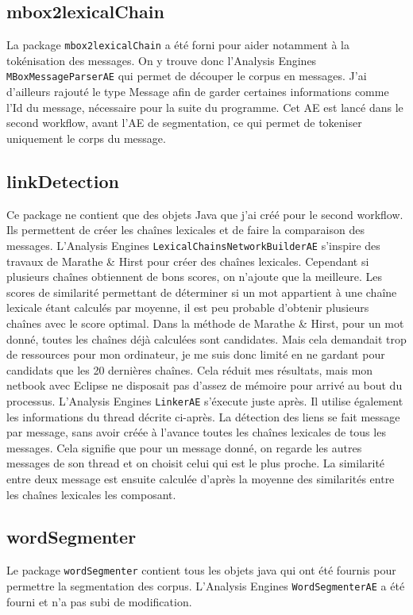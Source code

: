 \documentclass[a4paper]{article}
\begin{document}
	\subsection{mbox2lexicalChain}
	La package \texttt{mbox2lexicalChain} a été forni pour aider notamment à la tokénisation des messages. On y trouve donc l'Analysis Engines \texttt{MBoxMessageParserAE} qui permet de découper le corpus en messages. J'ai d'ailleurs rajouté le type Message afin de garder certaines informations comme l’Id du message, nécessaire pour la suite du programme. Cet AE est lancé dans le second workflow, avant l'AE de segmentation, ce qui permet de tokeniser uniquement le corps du message.

	\subsection{linkDetection}
	Ce package ne contient que des objets Java que j'ai créé pour le second workflow. Ils permettent de créer les chaînes lexicales et de faire la comparaison des messages. L'Analysis Engines \texttt{LexicalChainsNetworkBuilderAE} s’inspire des travaux de Marathe \& Hirst pour créer des chaînes lexicales. Cependant si plusieurs chaînes obtiennent de bons scores, on n’ajoute que la meilleure. Les scores de similarité permettant de déterminer si un mot appartient à une chaîne lexicale étant calculés par moyenne, il est peu probable d’obtenir plusieurs chaînes avec le score optimal. Dans la méthode de Marathe \& Hirst, pour un mot donné, toutes les chaînes déjà calculées sont candidates. Mais cela demandait trop de ressources pour mon ordinateur, je me suis donc limité en ne gardant pour candidats que les 20 dernières chaînes. Cela réduit mes résultats, mais mon netbook avec Eclipse ne disposait pas d'assez de mémoire pour arrivé au bout du processus. L'Analysis Engines \texttt{LinkerAE} s'éxecute juste après. Il utilise également les informations du thread décrite ci-après. La détection des liens se fait message par message, sans avoir créée à l'avance toutes les chaînes lexicales de tous les messages. Cela signifie que pour un message donné, on regarde les autres messages de son thread et on choisit celui qui est le plus proche. La similarité entre deux message est ensuite calculée d’après la moyenne des similarités entre les chaînes lexicales les composant.

	\subsection{wordSegmenter}
	Le package \texttt{wordSegmenter} contient tous les objets java qui ont été fournis pour permettre la segmentation des corpus. L'Analysis Engines \texttt{WordSegmenterAE} a été fourni et n'a pas subi de modification.
\end{document}
